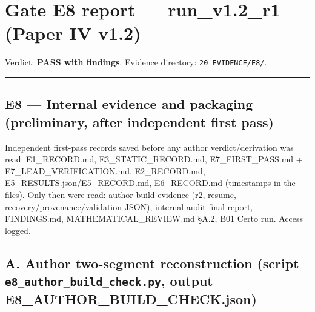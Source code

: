 \documentclass[
]{article}
\author{}
\date{}
\begin{document}
\section{Gate E8 report --- run\_v1.2\_r1 (Paper IV
v1.2)}\label{gate-e8-report--run_v12_r1-paper-iv-v12}

Verdict: \textbf{PASS with findings}. Evidence directory:
\texttt{20\_EVIDENCE/E8/}.

\begin{center}\rule{0.5\linewidth}{0.5pt}\end{center}

\subsection{E8 --- Internal evidence and packaging (preliminary, after
independent first
pass)}\label{e8--internal-evidence-and-packaging-preliminary-after-independent-first-pass}

Independent first-pass records saved before any author
verdict/derivation was read: E1\_RECORD.md, E3\_STATIC\_RECORD.md,
E7\_FIRST\_PASS.md + E7\_LEAD\_VERIFICATION.md, E2\_RECORD.md,
E5\_RESULTS.json/E5\_RECORD.md, E6\_RECORD.md (timestamps in the files).
Only then were read: author build evidence (r2, resume,
recovery/provenance/validation JSON), internal-audit final report,
FINDINGS.md, MATHEMATICAL\_REVIEW.md §A.2, B01 Certo run. Access logged.

\subsection{\texorpdfstring{A. Author two-segment reconstruction (script
\texttt{e8\_author\_build\_check.py}, output
E8\_AUTHOR\_BUILD\_CHECK.json)}{A. Author two-segment reconstruction (script e8\_author\_build\_check.py, output E8\_AUTHOR\_BUILD\_CHECK.json)}}\label{a-author-two-segment-reconstruction-script-e8_author_build_checkpy-output-e8_author_build_checkjson}
\end{document}
